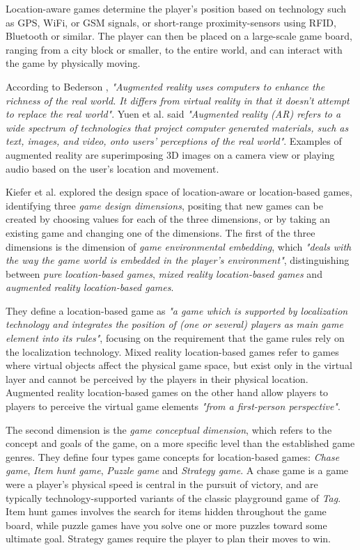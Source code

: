 Location-aware games determine the player's position based on technology such as GPS, WiFi, or GSM signals, or short-range proximity-sensors using RFID, Bluetooth or similar. The player can then be placed on a large-scale game board, ranging from a city block or smaller, to the entire world, and can interact with the game by physically moving.

According to Bederson \cite{bederson1995ar}, \emph{"Augmented reality uses computers to enhance the richness of the real world. It differs from virtual reality in that it doesn’t attempt to replace the real world"}. Yuen et al. \cite{yuen2011augmented} said \emph{"Augmented reality (AR) refers to a wide spectrum of technologies that project computer generated materials, such as text, images, and video, onto users’ perceptions of the real world"}. Examples of augmented reality are superimposing 3D images on a camera view or playing audio based on the user's location and movement.

Kiefer et al. \cite{kiefer2006systematically} explored the design space of location-aware or location-based games, identifying three \emph{game design dimensions}, positing that new games can be created by choosing values for each of the three dimensions, or by taking an existing game and changing one of the dimensions. The first of the three dimensions is the dimension of \emph{game environmental embedding}, which \emph{"deals with the way the game world is embedded in the player’s environment"}, distinguishing between \emph{pure location-based games}, \emph{mixed reality location-based games} and \emph{augmented reality location-based games}.

They define a location-based game as \emph{"a game which is supported by localization technology and integrates the position of (one or several) players as main game element into its rules"}, focusing on the requirement that the game rules rely on the localization technology. Mixed reality location-based games refer to games where virtual objects affect the physical game space, but exist only in the virtual layer and cannot be perceived by the players in their physical location. Augmented reality location-based games on the other hand allow players to players to perceive the virtual game elements \emph{"from a first-person perspective"}.

The second dimension is the \emph{game conceptual dimension}, which refers to the concept and goals of the game, on a more specific level than the established game genres. They define four types game concepts for location-based games: \emph{Chase game}, \emph{Item hunt game}, \emph{Puzzle game} and \emph{Strategy game}. A chase game is a game were a player's physical speed is central in the pursuit of victory, and are typically technology-supported variants of the classic playground game of \emph{Tag}. Item hunt games involves the search for items hidden throughout the game board, while puzzle games have you solve one or more puzzles toward some ultimate goal. Strategy games require the player to plan their moves to win.

